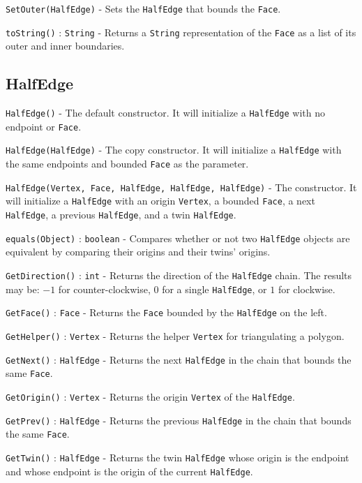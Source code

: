\documentclass[11pt]{article}
\begin{document}
	\texttt{SetOuter(HalfEdge)} - Sets the \texttt{HalfEdge} that bounds the \texttt{Face}.
	
	\texttt{toString()} : \texttt{String} - Returns a \texttt{String} representation of the \texttt{Face} as a list of its outer and inner boundaries.

\subsection{HalfEdge}
\label{sec:halfedge}

	\texttt{HalfEdge()} - The default constructor. It will initialize a \texttt{HalfEdge} with no endpoint or \texttt{Face}.
	
	\texttt{HalfEdge(HalfEdge)} - The copy constructor. It will initialize a \texttt{HalfEdge} with the same endpoints and bounded \texttt{Face} as the parameter.
	
	\texttt{HalfEdge(Vertex, Face, HalfEdge, HalfEdge, HalfEdge)} - The constructor. It will initialize a \texttt{HalfEdge} with an origin \texttt{Vertex}, a bounded \texttt{Face}, a next \texttt{HalfEdge}, a previous \texttt{HalfEdge}, and a twin \texttt{HalfEdge}.
	 
	\texttt{equals(Object)} : \texttt{boolean} - Compares whether or not two \texttt{HalfEdge} objects are equivalent by comparing their origins and their twins' origins.
	
	\texttt{GetDirection()} : \texttt{int} - Returns the direction of the \texttt{HalfEdge} chain. The results may be: $-1$ for counter-clockwise, $0$ for a single \texttt{HalfEdge}, or $1$ for clockwise.
	
	\texttt{GetFace()} : \texttt{Face} - Returns the \texttt{Face} bounded by the \texttt{HalfEdge} on the left.
	
	\texttt{GetHelper()} : \texttt{Vertex} - Returns the helper \texttt{Vertex} for triangulating a polygon.
	
	\texttt{GetNext()} : \texttt{HalfEdge} - Returns the next \texttt{HalfEdge} in the chain that bounds the same \texttt{Face}.
	
	\texttt{GetOrigin()} : \texttt{Vertex} - Returns the origin \texttt{Vertex} of the \texttt{HalfEdge}.
	
	\texttt{GetPrev()} : \texttt{HalfEdge} - Returns the previous \texttt{HalfEdge} in the chain that bounds the same \texttt{Face}.
	
	\texttt{GetTwin()} : \texttt{HalfEdge} - Returns the twin \texttt{HalfEdge} whose origin is the endpoint and whose endpoint is the origin of the current \texttt{HalfEdge}.
	
\end{document}
